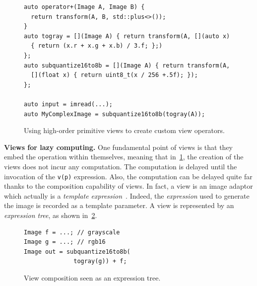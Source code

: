 \begin{figure}
  \noindent
  \begin{verbatim}
auto operator+(Image A, Image B) {
  return transform(A, B, std::plus<>());
}
auto togray = [](Image A) { return transform(A, [](auto x)
  { return (x.r + x.g + x.b) / 3.f; };)
};
auto subquantize16to8b = [](Image A) { return transform(A,
  [](float x) { return uint8_t(x / 256 +.5f); });
};

auto input = imread(...);
auto MyComplexImage = subquantize16to8b(togray(A));
  \end{verbatim}

  \caption{Using high-order primitive views to create custom view operators.}
  \label{fig.view.highorder}
\end{figure}

\textbf{Views for lazy computing.} One fundamental point of views is that they embed the operation within themselves,
meaning that in~\cref{fig.view.highorder}, the creation of the views does not incur any computation. The computation is
delayed until the invocation of the \texttt{v(p)} expression. Also, the computation can be delayed quite far thanks to
the composition capability of views. In fact, a view is an image adaptor which actually is a \emph{template
  expression}~\parencite{veldhuizen.1995.expression, veldhuizen.2000.blitz}. Indeed, the \emph{expression} used to generate
the image is recorded as a template parameter. A view is represented by an \emph{expression tree}, as shown
in~\cref{fig.view.ast}.


\begin{figure}
  \null\hfill
  \begin{minipage}[b]{2cm}
    
  \end{minipage}
  \begin{minipage}[b]{5.5cm}
    \begin{verbatim}
Image f = ...; // grayscale
Image g = ...; // rgb16
Image out = subquantize16to8b(
              togray(g)) + f;
\end{verbatim}
  \end{minipage}
  \caption{View composition seen as an expression tree.}
  \label{fig.view.ast}
\end{figure}




